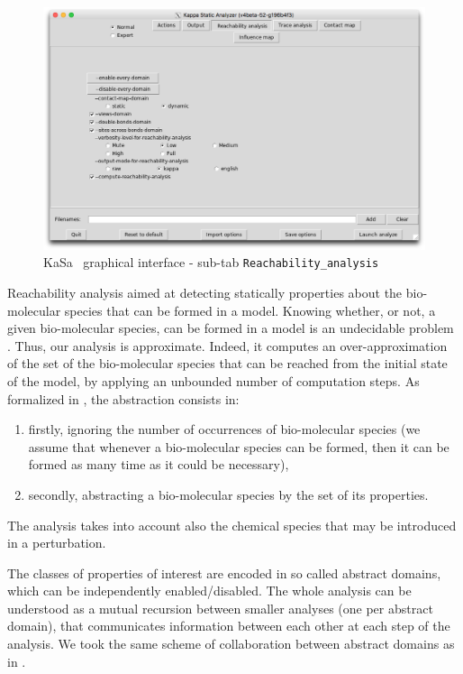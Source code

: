 \documentclass[11pt]{book}
\def\KaSa{\textsf{KaSa}}
\begin{document}
\begin{figure}[htbp]
\centering
\includegraphics[width=12cm,bb=0 0 1904 1208]{img/kasa_2.png}
\caption{\KaSa~ graphical interface - sub-tab \texttt{Reachability\_analysis}}
\label{fig:kasa:2}
\end{figure}

Reachability analysis aimed at detecting statically properties about the bio-molecular species that can be formed in a model.
Knowing whether, or not, a given bio-molecular species, can be formed in a model is an undecidable problem \cite{Kreyssig}. Thus, our analysis is approximate. Indeed, it computes an over-approximation of the set of the bio-molecular species that can be reached from the initial state of the model, by applying an unbounded number of computation steps. As formalized in \cite{DanosEtAl-VMCAI08,Feret:SASB2016}, the abstraction consists in:
\begin{enumerate}
\item firstly, ignoring the number of occurrences of bio-molecular species (we assume that whenever a bio-molecular species can be formed, then it can be formed as many time as it could be necessary),
\item secondly, abstracting a bio-molecular species by the set of its properties.
\end{enumerate}
The analysis takes into account also the chemical species that may be introduced in a perturbation.

The classes of properties of interest are encoded in so called abstract domains, which can be independently enabled/disabled. The whole analysis can be understood as a mutual recursion between smaller analyses (one per abstract domain), that communicates information between each other at each step of the analysis. We took the same scheme of collaboration between abstract domains as in  \cite{CousotEtAl06-ASIAN}.
\end{document}
